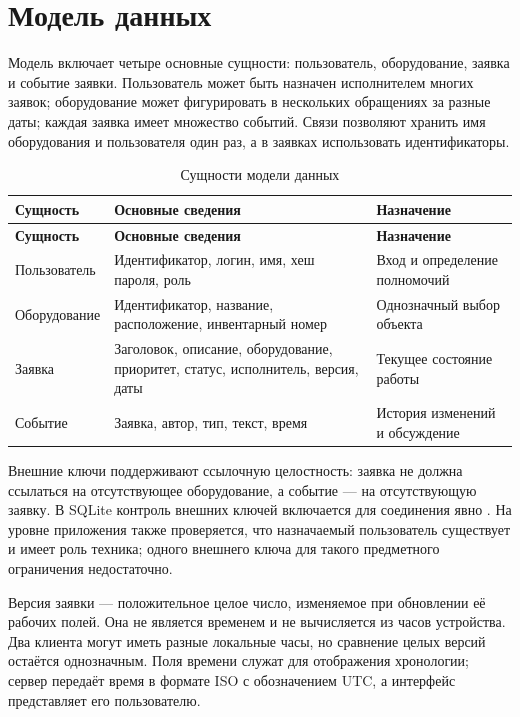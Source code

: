 \documentclass{timcw}
\begin{document}
\section{Модель данных}

Модель включает четыре основные сущности: пользователь, оборудование, заявка и событие заявки. Пользователь может быть назначен исполнителем многих заявок; оборудование может фигурировать в нескольких обращениях за разные даты; каждая заявка имеет множество событий. Связи позволяют хранить имя оборудования и пользователя один раз, а в заявках использовать идентификаторы.

\begingroup\small\singlespacing
\begin{longtable}{>{\raggedright\arraybackslash}p{}>{\raggedright\arraybackslash}p{}>{\raggedright\arraybackslash}p{}}
\caption{Сущности модели данных}\\
\hline
\textbf{Сущность} & \textbf{Основные сведения} & \textbf{Назначение} \\ \hline
\endfirsthead
\textbf{Сущность} & \textbf{Основные сведения} & \textbf{Назначение} \\ \hline
\endhead
Пользователь & Идентификатор, логин, имя, хеш пароля, роль & Вход и определение полномочий \\ \hline
Оборудование & Идентификатор, название, расположение, инвентарный номер & Однозначный выбор объекта \\ \hline
Заявка & Заголовок, описание, оборудование, приоритет, статус, исполнитель, версия, даты & Текущее состояние работы \\ \hline
Событие & Заявка, автор, тип, текст, время & История изменений и обсуждение \\ \hline
\end{longtable}
\endgroup

Внешние ключи поддерживают ссылочную целостность: заявка не должна ссылаться на отсутствующее оборудование, а событие — на отсутствующую заявку. В SQLite контроль внешних ключей включается для соединения явно \cite{src5}. На уровне приложения также проверяется, что назначаемый пользователь существует и имеет роль техника; одного внешнего ключа для такого предметного ограничения недостаточно.

Версия заявки — положительное целое число, изменяемое при обновлении её рабочих полей. Она не является временем и не вычисляется из часов устройства. Два клиента могут иметь разные локальные часы, но сравнение целых версий остаётся однозначным. Поля времени служат для отображения хронологии; сервер передаёт время в формате ISO с обозначением UTC, а интерфейс представляет его пользователю.
\end{document}
